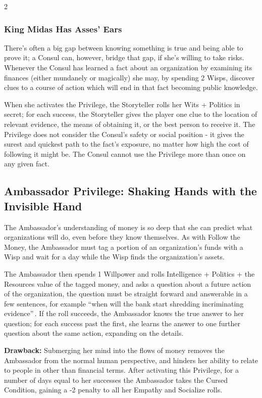 \begin{multicols}{2}
\subsubsection*{King Midas Has Asses' Ears}
There's often a big gap between knowing something is true and being able to prove it; a Consul can, however, bridge that gap, if she's willing to take risks. Whenever the Consul has learned a fact about an organization by examining its finances (either mundanely or magically) she may, by spending 2 Wisps, discover clues to a course of action which will end in that fact becoming public knowledge.

When she activates the Privilege, the Storyteller rolls her Wits + Politics in secret; for each success, the Storyteller gives the player one clue to the location of relevant evidence, the means of obtaining it, or the best person to receive it. The Privilege does not consider the Consul's safety or social position - it gives the surest and quickest path to the fact's exposure, no matter how high the cost of following it might be. The Consul cannot use the Privilege more than once on any given fact. 
\subsection*{Ambassador Privilege: Shaking Hands with the Invisible Hand}

The Ambassador's understanding of money is so deep that she can predict what organizations will do, even before they know themselves. As with Follow the Money, the Ambassador must tag a portion of an organization's funds with a Wisp and wait for a day while the Wisp finds the organization's assets.

The Ambassador then spends 1 Willpower and rolls Intelligence + Politics + the Resources value of the tagged money, and asks a question about a future action of the organization, the question must be straight forward and answerable in a few sentences, for example \textquotedblleft when will the bank start shredding incriminating evidence\textquotedblright\,. If the roll succeeds, the Ambassador knows the true answer to her question; for each success past the first, she learns the answer to one further question about the same action, expanding on the details.

\textbf{Drawback:} Submerging her mind into the flows of money removes the Ambassador from the normal human perspective, and hinders her ability to relate to people in other than financial terms. After activating this Privilege, for a number of days equal to her successes the Ambassador takes the Cursed Condition, gaining a -2 penalty to all her Empathy and Socialize rolls. 


\end{multicols}
